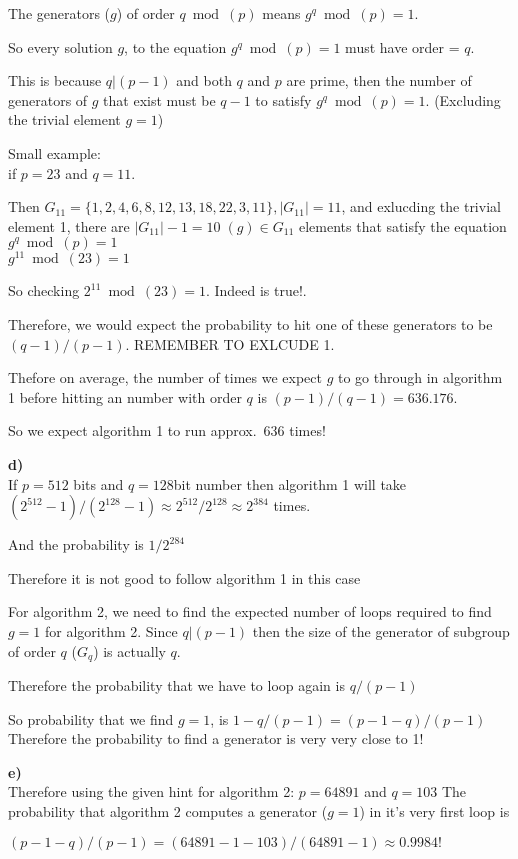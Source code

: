 \documentclass[12pt]{article}
\begin{document}
\begin{enumerate}
The generators (\( g \)) of order \( q \bmod(p) \) means \( g^q \bmod(p) = 1 \).

So every solution \( g \), to the equation \( g^q \bmod(p) = 1 \) must have order = \( q \).

This is because  \( q | (p - 1) \) and both \( q \) and \( p \) are prime, 
then the number of generators of \( g \) that exist must be \( q-1 \) 
to satisfy \( g^q \bmod(p) = 1 \). (Excluding the trivial element \( g = 1 \))

Small example: \\
if \( p = 23 \) and \( q = 11 \).

Then \( G_{11} = \{1,2,4,6,8,12,13,18,22,3,11\}, |G_{11}| = 11 \), and exlucding the trivial
element 1, there are \( |G_{11}| - 1 = 10 \; (g) \in G_{11} \) elements that satisfy the equation
\( g^q \bmod (p) = 1 \) \\
\( g^{11} \bmod (23) = 1 \)

So checking \( 2^{11} \bmod(23) = 1 \). Indeed is true!.

Therefore, we would expect the probability to hit one of these generators
to be \( (q-1) / (p-1) \). REMEMBER TO EXLCUDE 1.

Thefore on average, the number of times we expect \( g \) to go through in algorithm 1
before hitting an number with order \( q \) is \( (p-1) / (q-1) = 636.176 \).

So we expect algorithm 1 to run approx.\ 636 times!

\textbf{d)} \\
If \( p = 512 \) bits and \( q = 128 \)bit number then algorithm 1 will take 
\( (2^{512} - 1) / (2^{128} - 1) \approx 2^{512} / 2^{128} \approx 2^{384} \) times.

And the probability is \( 1/2^{284} \)

Therefore it is not good to follow  algorithm 1 in this case

For algorithm 2, we need to find the expected number of loops required to find \( g=1 \) for algorithm 2.
Since \( q | (p-1) \) then the size of the generator of subgroup of order \( q \) (\( G_q \)) is actually \( q \). 

Therefore the probability that we have to loop again is \( q/(p-1) \)

So probability that we find \( g = 1 \), is \( 1 - q/(p-1) = (p - 1 - q) / (p - 1) \)
Therefore the probability to find a generator is very very close to 1!

\textbf{e)} \\
Therefore using the given hint for algorithm 2: \( p = 64891 \) and \( q = 103 \)
The probability that algorithm 2 computes a generator (\( g = 1 \)) in it's very first loop is 

\(  (p - 1 - q) / (p - 1) = (64891 - 1 - 103) / (64891 - 1) \approx 0.9984! \)

\end{enumerate}
\end{document}
